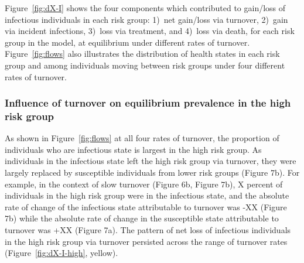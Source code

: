 \par
Figure~\ref{fig:dX-I} shows the four components which contributed to 
gain/loss of infectious individuals in each risk group:
1)~net gain/loss via turnover,
2)~gain via incident infections,
3)~loss via treatment, and
4)~loss via death,
for each risk group in the model,
at equilibrium under different rates of turnover.
Figure~\ref{fig:flows} also illustrates
the distribution of health states in each risk group
and among individuals moving between risk groups
under four different rates of turnover.
\subsubsection{Influence of turnover on equilibrium prevalence in the high risk group}		%
\label{sss:res-prev-high}
As shown in Figure~\ref{fig:flows} at all four rates of turnover,
the proportion of individuals 
who are infectious state is largest in the high risk group. 
As individuals in the infectious state left
the high risk group via turnover, they were largely 
replaced by susceptible individuals from lower risk groups (Figure 7b). 		%
For example, in the context of slow turnover (Figure 6b, Figure 7b), 			%
X percent of individuals in the high risk group were in the infectious state,
and the absolute rate of change of the infectious state 
attributable to turnover was -XX (Figure 7b) while the
absolute rate of change in the susceptible state attributable to 
turnover was +XX (Figure 7a). The pattern of net loss of 
infectious individuals in the high risk group via turnover
persisted across the range of turnover rates (Figure~\ref{fig:dX-I-high}, yellow).			%


